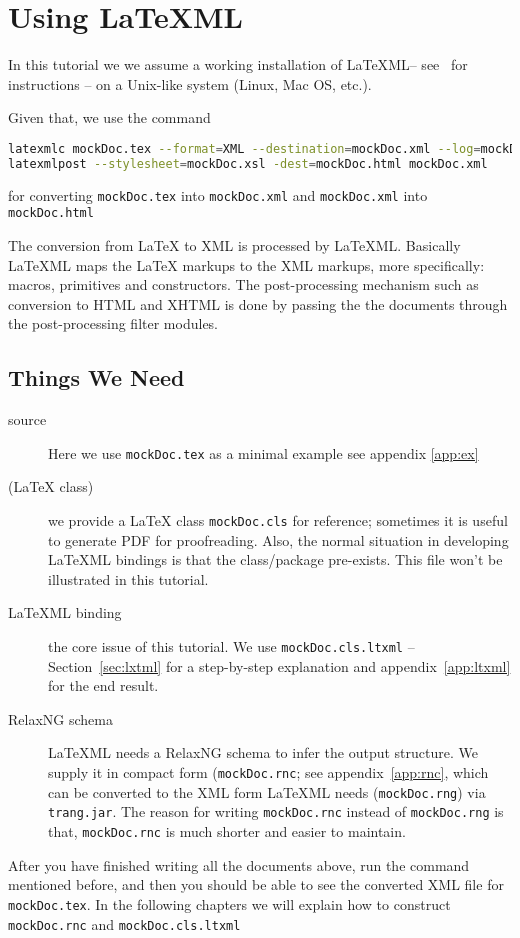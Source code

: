 \documentclass[a4paper]{article}
\def\latexml{{\LaTeX}ML\xspace}
\begin{document}
\section{Using LaTeXML}\label{sec:using}

In this tutorial we we assume a working installation of \latexml -- see~\cite{LaTeXML:get}
for instructions -- on a Unix-like system (Linux, Mac OS, etc.). 

 Given that, we use the
command
\begin{lstlisting}[language=bash]
latexmlc mockDoc.tex --format=XML --destination=mockDoc.xml --log=mockDoc.xml.log
latexmlpost --stylesheet=mockDoc.xsl -dest=mockDoc.html mockDoc.xml 
\end{lstlisting}
for converting \lstinline|mockDoc.tex| into \lstinline|mockDoc.xml| and \lstinline|mockDoc.xml| into
\lstinline|mockDoc.html| 

The conversion from {\LaTeX} to XML is processed by \latexml. Basically \latexml maps the
{\LaTeX} markups to the XML markups, more specifically: macros, primitives and
constructors. The post-processing mechanism such as conversion to HTML and XHTML is done by 
passing the the documents through the post-processing filter modules.

\subsection{Things We Need}
\begin{description}
\item[source] Here we use \lstinline|mockDoc.tex| as a minimal example see appendix \ref{app:ex}
\item[({\LaTeX} class)] we provide a {\LaTeX} class \lstinline|mockDoc.cls| for reference;
  sometimes it is useful to generate PDF for proofreading. Also, the normal situation in
  developing \latexml bindings is that the class/package pre-exists. This file won't be
  illustrated in this tutorial. 
\item[\latexml binding] the core issue of this tutorial. We use \lstinline|mockDoc.cls.ltxml|
  -- Section~\ref{sec:lxtml} for a step-by-step explanation and appendix~\ref{app:ltxml}
  for the end result.
\item[RelaxNG schema] \latexml needs a RelaxNG schema to infer the output structure. We
  supply it in compact form (\lstinline|mockDoc.rnc|; see appendix~\ref{app:rnc}, which
  can be converted to the XML form \latexml needs (\lstinline|mockDoc.rng|) via
  \lstinline|trang.jar|.  The reason for writing \lstinline|mockDoc.rnc| instead of
  \lstinline|mockDoc.rng| is that, \lstinline|mockDoc.rnc| is much shorter and easier to
  maintain. 
\end{description}
After you have finished writing all the documents above, run the command mentioned before,
and then you should be able to see the converted XML file for \lstinline|mockDoc.tex|. In
the following chapters we will explain how to construct \lstinline|mockDoc.rnc| and
\lstinline|mockDoc.cls.ltxml|
\end{document}
